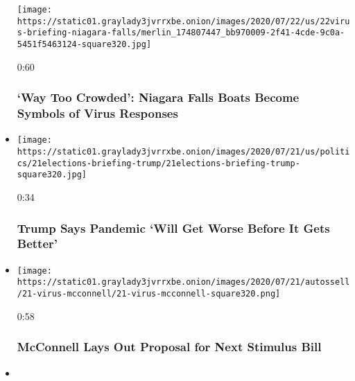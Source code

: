 \begin{itemize}
  \texttt{[image: https://static01.graylady3jvrrxbe.onion/images/2020/07/22/us/22virus-briefing-niagara-falls/merlin\_174807447\_bb970009-2f41-4cde-9c0a-5451f5463124-square320.jpg]}

  0:60

  \hypertarget{way-too-crowded-niagara-falls-boats-become-symbols-of-virus-responses}{%
  \subsubsection{`Way Too Crowded': Niagara Falls Boats Become Symbols
  of Virus
  Responses}\label{way-too-crowded-niagara-falls-boats-become-symbols-of-virus-responses}}
\item
  \href{https://www.nytimes3xbfgragh.onion/video/us/100000007250068/trump-says-virus-worse-before-better.html?action=click\&module=video-series-bar\&region=header\&pgtype=Article\&playlistId=video/coronavirus-news-update}{}

  \texttt{[image: https://static01.graylady3jvrrxbe.onion/images/2020/07/21/us/politics/21elections-briefing-trump/21elections-briefing-trump-square320.jpg]}

  0:34

  \hypertarget{trump-says-pandemic-will-get-worse-before-it-gets-better}{%
  \subsubsection{Trump Says Pandemic `Will Get Worse Before It Gets
  Better'}\label{trump-says-pandemic-will-get-worse-before-it-gets-better}}
\item
  \href{https://www.nytimes3xbfgragh.onion/video/us/100000007250230/mcconnell-proposal-relief-package.html?action=click\&module=video-series-bar\&region=header\&pgtype=Article\&playlistId=video/coronavirus-news-update}{}

  \texttt{[image: https://static01.graylady3jvrrxbe.onion/images/2020/07/21/autossell/21-virus-mcconnell/21-virus-mcconnell-square320.png]}

  0:58

  \hypertarget{mcconnell-lays-out-proposal-for-next-stimulus-bill}{%
  \subsubsection{McConnell Lays Out Proposal for Next Stimulus
  Bill}\label{mcconnell-lays-out-proposal-for-next-stimulus-bill}}
\item
  \href{https://www.nytimes3xbfgragh.onion/video/us/politics/100000007247561/cuomo-coronavirus-warning.html?action=click\&module=video-series-bar\&region=header\&pgtype=Article\&playlistId=video/coronavirus-news-update}{}


\end{itemize}
